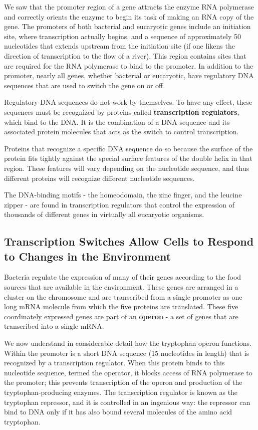We saw that the promoter region of a gene
attracts the enzyme RNA polymerase and correctly orients the enzyme to
begin its task of making an RNA copy of the gene. The promoters of both
bacterial and eucaryotic genes include an initiation site, where transcription
actually begins, and a sequence of approximately 50 nucleotides that
extends upstream from the initiation site (if one likens the direction of
transcription to the flow of a river). This region contains sites that are
required for the RNA polymerase to bind to the promoter. In addition
to the promoter, nearly all genes, whether bacterial or eucaryotic, have
regulatory DNA sequences that are used to switch the gene on or off.

Regulatory DNA sequences do not work by themselves. To have any
effect, these sequences must be recognized by proteins called \textbf{transcription
regulators}, which bind to the DNA. It is the combination of a DNA
sequence and its associated protein molecules that acts as the switch
to control transcription.

Proteins that recognize a specific DNA sequence do so because the surface
of the protein fits tightly against the special surface features of the
double helix in that region. These features will vary depending on the
nucleotide sequence, and thus different proteins will recognize different
nucleotide sequences.

The DNA-binding motifs - the homeodomain, the zinc finger, and the leucine zipper -
are found in transcription regulators that control the expression of thousands of different
genes in virtually all eucaryotic organisms.

\subsection{Transcription Switches Allow Cells to Respond to Changes in the Environment}

Bacteria regulate the expression of many of their genes according to the food sources
that are available in the environment. These
genes are arranged in a cluster on the chromosome and are transcribed
from a single promoter as one long mRNA molecule from which the five
proteins are translated. These five coordinately expressed genes are part of an
\textbf{operon} - a set of genes that are transcribed into a single mRNA.

We now understand in considerable detail how the tryptophan operon
functions. Within the promoter is a short DNA sequence (15 nucleotides
in length) that is recognized by a transcription regulator. When this protein
binds to this nucleotide sequence, termed the operator, it blocks
access of RNA polymerase to the promoter; this prevents transcription
of the operon and production of the tryptophan-producing enzymes. The
transcription regulator is known as the tryptophan repressor, and it is controlled
in an ingenious way: the repressor can bind to DNA only if it has
also bound several molecules of the amino acid tryptophan.

